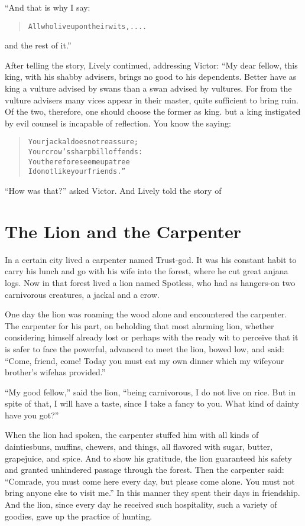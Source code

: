 \documentclass[article, twoside, 14pt]{memoir}
\renewenvironment{verbatim}{%
\begin{quote}%
\vskip -10pt%
\begin{alltt}\normalfont\large}{\end{alltt}%
\end{quote}%
\vskip -10pt
} %
\begin{document}
“And that is why I say:

\begin{verbatim}
All who live upon their wits,....
\end{verbatim}
and the rest of it.”

After telling the story, Lively continued, addressing Victor: “My
dear fellow, this king, with his shabby advisers, brings no good to
his dependents. Better have as king a vulture advised by swans than
a swan advised by vultures. For from the vulture advisers many
vices appear in their master, quite sufficient to bring ruin. Of
the two, therefore, one should choose the former as king. but a
king instigated by evil counsel is incapable of reflection. You
know the saying:

\begin{verbatim}
Your jackal does not reassure;
    Your crow's sharp bill offends:
You therefore see me up a tree{\textemdash}
    I do not like your friends.”
\end{verbatim}
``How was that?'' asked Victor. And Lively told the story of

\chapter{The Lion and the Carpenter}

\label{s17}

In a certain city lived a carpenter named Trust-god. It was
his constant habit to carry his lunch and go with his wife into the
forest, where he cut great anjana logs. Now in that forest lived a
lion named Spotless, who had as hangers-on two carnivorous
creatures, a jackal and a crow.

One day the lion was roaming the wood alone and encountered the
carpenter. The carpenter for his part, on beholding that most
alarming lion, whether considering himself already lost or perhaps
with the ready wit to perceive that it is safer to face the
powerful, advanced to meet the lion, bowed low, and said:
``Come, friend, come! Today you must eat my own dinner which my wife{\textemdash}your brother's wife{\textemdash}has provided.''

``My good fellow,'' said the lion,
``being carnivorous, I do not live on rice. But in spite of that, I will have a taste, since I take a fancy to you. What kind of dainty have you got?''

When the lion had spoken, the carpenter stuffed him with all kinds
of dainties{\textemdash}buns, muffins, chewers, and things, all flavored with
sugar, butter, grapejuice, and spice. And to show his gratitude,
the lion guaranteed his safety and granted unhindered passage
through the forest. Then the carpenter said:
``Comrade, you must come here every day, but please come alone. You must not bring anyone else to visit me.''
In this manner they spent their days in friendship. And the lion,
since every day he received such hospitality, such a variety of
goodies, gave up the practice of hunting.
\end{document}

